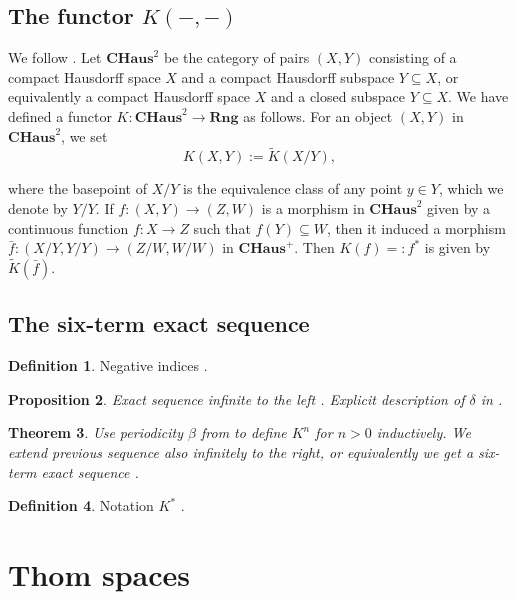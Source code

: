 \documentclass[12pt,a4paper]{amsart}
\theoremstyle{plain}
\newtheorem{thm}{Theorem}
\newtheorem{prop}[thm]{Proposition}
\theoremstyle{definition}
\newtheorem{defn}[thm]{Definition}
\theoremstyle{remark}
\begin{document}
\subsection{The functor $K(-,-)$}
We follow \cite[p.~66]{ati67}.
Let $\mathbf{CHaus}^{2}$ be the category of pairs $(X,Y)$ consisting of a compact Hausdorff space $X$ and a compact Hausdorff subspace $Y \subseteq X$, or equivalently a compact Hausdorff space $X$ and a closed subspace $Y \subseteq X$.
We have defined a functor $K \colon \mathbf{CHaus}^{2} \to \mathbf{Rng}$ as follows.
For an object $(X,Y)$ in $\mathbf{CHaus}^{2}$, we set
\[ K(X,Y) := \tilde{K}(X/Y), \]

where the basepoint of $X/Y$ is the equivalence class of any point $y \in Y$, which we denote by $Y/Y$.
If $f \colon (X,Y) \to (Z,W)$ is a morphism in $\mathbf{CHaus}^{2}$ given by a continuous function $f \colon X \to Z$ such that $f(Y) \subseteq W$, then it induced a morphism $\bar{f} \colon (X/Y,Y/Y) \to (Z/W, W/W)$ in $\mathbf{CHaus}^{+}$.
Then $K(f) =: f^{*}$ is given by $\tilde{K}(\bar{f})$.

\subsection{The six-term exact sequence}

\begin{defn}
  Negative indices \cite[Definition 2.4.1]{ati67}.
\end{defn}

\begin{prop}
  Exact sequence infinite to the left \cite[Proposition 2.4.4]{ati67}.
  Explicit description of $\delta$ in \cite[p.~72]{ati67}.
\end{prop}

\begin{thm}
  Use periodicity $\beta$ from \cite[Theorem 2.4.9]{ati67} to \textit{define} $K^{n}$ for $n>0$ inductively.
  We extend previous sequence also infinitely to the right, or equivalently we get a six-term exact sequence \cite[p.~78]{ati67}.
\end{thm}

\begin{defn}
  Notation $K^{*}$ \cite[p.~78]{ati67}.
\end{defn}

\section{Thom spaces}
\end{document}
